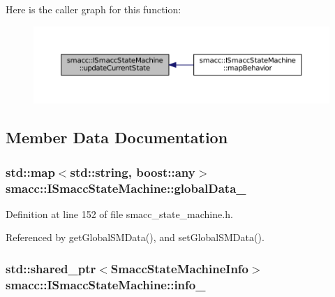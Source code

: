 Here is the caller graph for this function\+:
\nopagebreak
\begin{figure}[H]
\begin{center}
\leavevmode
\includegraphics[width=350pt]{classsmacc_1_1ISmaccStateMachine_aea0936b00b0186e8d4e514af16f69766_icgraph}
\end{center}
\end{figure}




\subsection{Member Data Documentation}
\subsubsection[{\texorpdfstring{global\+Data\+\_\+}{globalData_}}]{\setlength{\rightskip}{0pt plus 5cm}std\+::map$<$std\+::string, boost\+::any$>$ smacc\+::\+I\+Smacc\+State\+Machine\+::global\+Data\+\_\+\hspace{0.3cm}{\ttfamily [private]}}\hypertarget{classsmacc_1_1ISmaccStateMachine_a4af5edfc2584f74409ca194d2d869fac}{}\label{classsmacc_1_1ISmaccStateMachine_a4af5edfc2584f74409ca194d2d869fac}


Definition at line 152 of file smacc\+\_\+state\+\_\+machine.\+h.



Referenced by get\+Global\+S\+M\+Data(), and set\+Global\+S\+M\+Data().

\subsubsection[{\texorpdfstring{info\+\_\+}{info_}}]{\setlength{\rightskip}{0pt plus 5cm}std\+::shared\+\_\+ptr$<${\bf Smacc\+State\+Machine\+Info}$>$ smacc\+::\+I\+Smacc\+State\+Machine\+::info\+\_\+}\hypertarget{classsmacc_1_1ISmaccStateMachine_a5ec3201cbddab4f062f572fb33021041}{}\label{classsmacc_1_1ISmaccStateMachine_a5ec3201cbddab4f062f572fb33021041}


